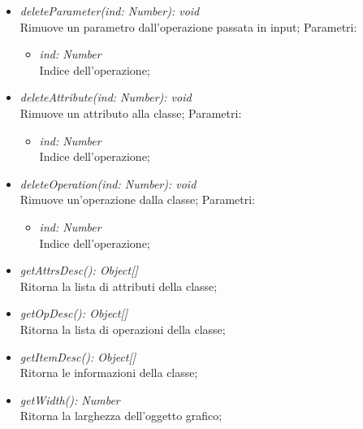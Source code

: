 \documentclass[../DefinizioneDiProdotto.tex]{subfiles}
\begin{document}
\begin{itemize}
\begin{itemize}
\begin{itemize}
					\end{itemize}
					\item \emph{deleteParameter(ind: Number): void}\\
					Rimuove un parametro dall'operazione passata in input;
					Parametri:
					\begin{itemize}
						\item \emph{ind: Number} \\
						Indice dell'operazione;
					\end{itemize}
					\item \emph{deleteAttribute(ind: Number): void}\\
					Rimuove un attributo alla classe;
					Parametri:
					\begin{itemize}
						\item \emph{ind: Number} \\
						Indice dell'operazione;
					\end{itemize}
					\item \emph{deleteOperation(ind: Number): void}\\
					Rimuove un'operazione dalla classe;
					Parametri:
					\begin{itemize}
						\item \emph{ind: Number} \\
						Indice dell'operazione;
					\end{itemize}
					\item \emph{getAttrsDesc(): Object[]}\\
					Ritorna la lista di attributi della classe;
					\item \emph{getOpDesc(): Object[]}\\
					Ritorna la lista di operazioni della classe;
					\item \emph{getItemDesc(): Object[]}\\
					Ritorna le informazioni della classe;		
					\item \emph{getWidth(): Number}\\
					Ritorna la larghezza dell'oggetto grafico;	
				\end{itemize}
			\end{itemize}
			
\end{document}
